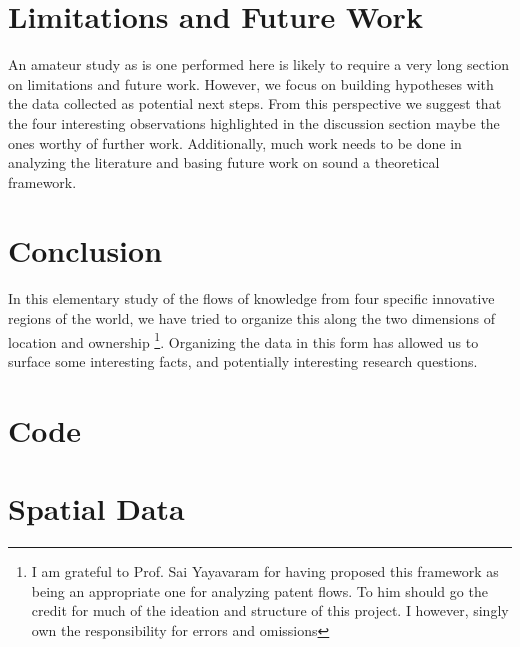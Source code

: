 \documentclass[12pt]{article}
\begin{document}
\section{Limitations and Future Work}
An amateur study as is one performed here is likely to require a very long section on limitations and future work. However, we focus on building hypotheses with the data collected as potential next steps. From this perspective we suggest that the four interesting observations highlighted in the discussion section maybe the ones worthy of further work. Additionally, much work needs to be done in analyzing the literature and basing future work on sound a theoretical framework.


\section{Conclusion}\label{S:Conclusion}
In this elementary study of the flows of knowledge from four specific innovative regions of the world, we have tried to organize this along the two dimensions of location and ownership \footnote{I am grateful to Prof. Sai Yayavaram for having proposed this framework as being an appropriate one for analyzing patent flows. To him should go the credit for much of the ideation and structure of this project. I however, singly own the responsibility for errors and omissions}. Organizing the data in this form has allowed us to surface some interesting facts, and potentially interesting research questions. 

 


\appendix

\section{Code}


\section{Spatial Data}
\end{document}
